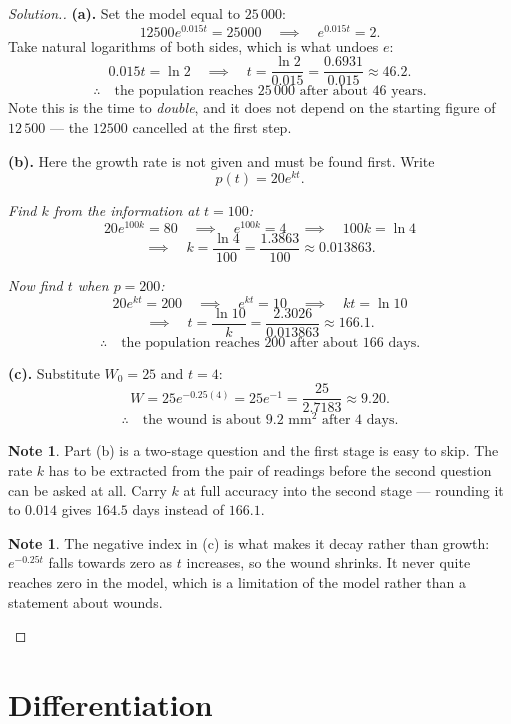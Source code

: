\documentclass[11pt,a4paper]{article}
\theoremstyle{definition}
\newtheorem{note}[thm]{Note}
\newenvironment{solution}
  {\renewcommand{\qedsymbol}{}\begin{proof}[\textit{Solution}.]}
  {\end{proof}}
\begin{document}
\begin{solution}
\textbf{(a).} Set the model equal to $25\,000$:
$$12500e^{0.015t}=25000\quad\implies\quad e^{0.015t}=2.$$
Take natural logarithms of both sides, which is what undoes $e$:
$$0.015t=\ln 2\quad\implies\quad t=\frac{\ln 2}{0.015}=\frac{0.6931}{0.015}
\approx 46.2.$$
$$\therefore\quad \text{the population reaches } 25\,000 \text{ after about } 46
\text{ years}.$$
Note this is the time to \emph{double}, and it does not depend on the starting figure of
$12\,500$ --- the $12500$ cancelled at the first step.

\textbf{(b).} Here the growth rate is not given and must be found first. Write
$$p(t)=20e^{kt}.$$

\emph{Find $k$ from the information at $t=100$:}
$$20e^{100k}=80\quad\implies\quad e^{100k}=4\quad\implies\quad 100k=\ln 4$$
$$\implies\quad k=\frac{\ln 4}{100}=\frac{1.3863}{100}\approx 0.013863.$$

\emph{Now find $t$ when $p=200$:}
$$20e^{kt}=200\quad\implies\quad e^{kt}=10\quad\implies\quad kt=\ln 10$$
$$\implies\quad t=\frac{\ln 10}{k}=\frac{2.3026}{0.013863}\approx 166.1.$$
$$\therefore\quad \text{the population reaches } 200 \text{ after about } 166
\text{ days}.$$

\textbf{(c).} Substitute $W_0=25$ and $t=4$:
$$W=25e^{-0.25(4)}=25e^{-1}=\frac{25}{2.7183}\approx 9.20.$$
$$\therefore\quad \text{the wound is about } 9.2\text{ mm}^2 \text{ after } 4
\text{ days}.$$

\begin{note}
Part (b) is a two-stage question and the first stage is easy to skip. The rate $k$ has
to be extracted from the pair of readings before the second question can be asked at
all. Carry $k$ at full accuracy into the second stage --- rounding it to $0.014$ gives
$164.5$ days instead of $166.1$.
\end{note}

\begin{note}
The negative index in (c) is what makes it decay rather than growth: $e^{-0.25t}$ falls
towards zero as $t$ increases, so the wound shrinks. It never quite reaches zero in the
model, which is a limitation of the model rather than a statement about wounds.
\end{note}
\end{solution}

\section{Differentiation}
\end{document}
